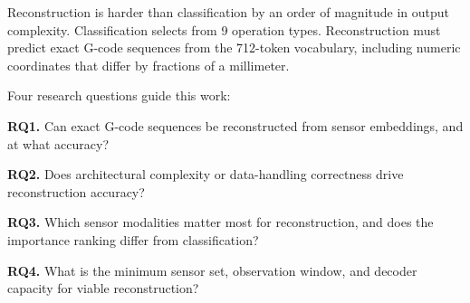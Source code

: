 \documentclass[sensors,article,submit,moreauthors,pdftex]{Definitions/mdpi}
\begin{document}
Reconstruction is harder than classification by an order of magnitude in output complexity. Classification selects from 9 operation types. Reconstruction must predict exact G-code sequences from the 712-token vocabulary, including numeric coordinates that differ by fractions of a millimeter.

Four research questions guide this work:

\noindent\textbf{RQ1.} Can exact G-code sequences be reconstructed from sensor embeddings, and at what accuracy?

\noindent\textbf{RQ2.} Does architectural complexity or data-handling correctness drive reconstruction accuracy?

\noindent\textbf{RQ3.} Which sensor modalities matter most for reconstruction, and does the importance ranking differ from classification?

\noindent\textbf{RQ4.} What is the minimum sensor set, observation window, and decoder capacity for viable reconstruction?
\end{document}
